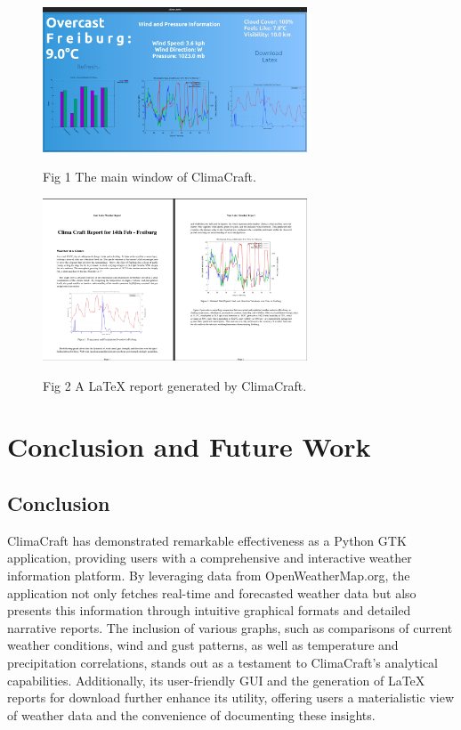 \documentclass[sn-mathphys-num]{sn-jnl}%
\begin{document}
\begin{figure}[htbp]
    \centering
    \includegraphics[width=0.70\textwidth]{Mainwindow.png}
    \parbox{\textwidth}{\centering Fig 1 The main window of ClimaCraft.}
    \label{fig:mainwindow}
\end{figure}

\begin{figure}[htbp]
    \centering
    \includegraphics[width=0.70\textwidth]{Latexreport.png}
    \parbox{\textwidth}{\centering Fig 2 A LaTeX report generated by ClimaCraft.}
    \label{fig:latexreport}
\end{figure}

\clearpage

\section{Conclusion and Future Work}\label{sec5}

\subsection{Conclusion}\label{sec5.1}
ClimaCraft has demonstrated remarkable effectiveness as a Python GTK application, providing users with a comprehensive and interactive weather information platform. By leveraging data from OpenWeatherMap.org, the application not only fetches real-time and forecasted weather data but also presents this information through intuitive graphical formats and detailed narrative reports. The inclusion of various graphs, such as comparisons of current weather conditions, wind and gust patterns, as well as temperature and precipitation correlations, stands out as a testament to ClimaCraft's analytical capabilities. Additionally, its user-friendly GUI and the generation of LaTeX reports for download further enhance its utility, offering users a materialistic view of weather data and the convenience of documenting these insights.
\end{document}

